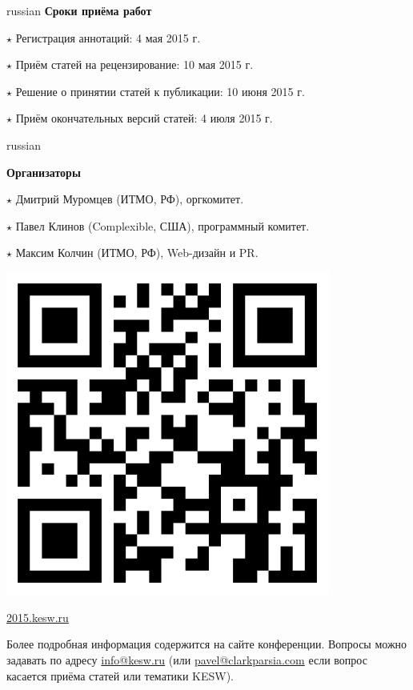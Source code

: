 \documentclass[a4paper, 10pt]{article}
\renewcommand{\skip}{\vspace{1ex}}
\renewcommand{\bullet}{\ensuremath{\star} }
\begin{document}
\begin{otherlanguage*}{russian}
\noindent\textbf{Сроки приёма работ}

\skip

\noindent
\bullet Регистрация аннотаций: 4 мая 2015 г.

\noindent
\bullet Приём статей на рецензирование: 10 мая 2015 г.

\noindent
\bullet Решение о принятии статей к публикации: 10 июня 2015 г.

\noindent
\bullet Приём окончательных версий статей: 4 июля 2015 г.

\skip

\hspace*{-\parindent}%
\begin{minipage}{.80\textwidth}
\begin{otherlanguage*}{russian}

\textbf{Организаторы}

\skip

\noindent
\bullet Дмитрий Муромцев (ИТМО, РФ), оргкомитет.

\bullet Павел Клинов (Complexible, США), программный комитет.

\bullet Максим Колчин (ИТМО, РФ), Web-дизайн и PR.

\end{otherlanguage*}
\end{minipage}
\begin{minipage}{.20\textwidth}
\includegraphics[width=0.8\textwidth]{qrcode}

\footnotesize{\url{2015.kesw.ru}}
\end{minipage}
\hfill


\vfill

\noindent Более подробная информация содержится на сайте конференции. Вопросы можно задавать по адресу \url{info@kesw.ru} (или \url{pavel@clarkparsia.com} если вопрос касается приёма статей или тематики KESW).

\end{otherlanguage*}
\end{document}
